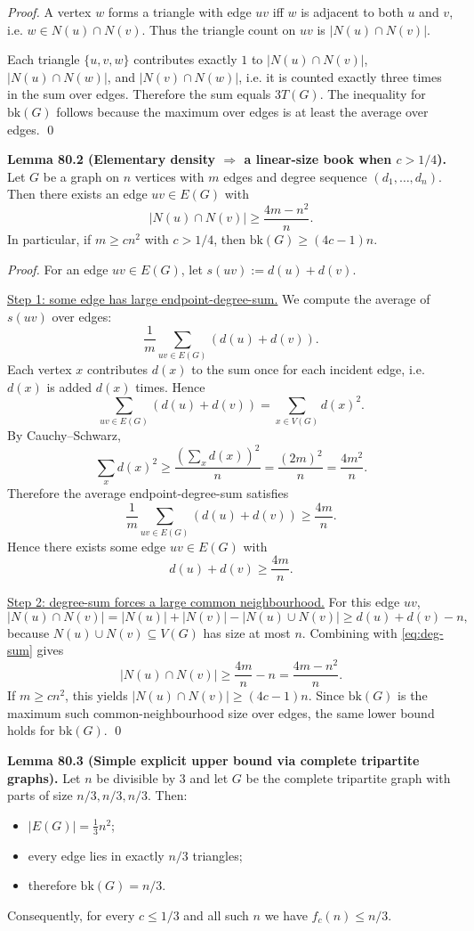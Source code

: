 \emph{Proof.}
A vertex $w$ forms a triangle with edge $uv$ iff $w$ is adjacent to both $u$ and $v$, i.e. $w\in N(u)\cap N(v)$. Thus the triangle count on $uv$ is $|N(u)\cap N(v)|$.

Each triangle $\{u,v,w\}$ contributes exactly $1$ to $|N(u)\cap N(v)|$, $|N(u)\cap N(w)|$, and $|N(v)\cap N(w)|$, i.e. it is counted exactly three times in the sum over edges. Therefore the sum equals $3T(G)$. The inequality for $\mathrm{bk}(G)$ follows because the maximum over edges is at least the average over edges. \qed

\medskip
\noindent\textbf{Lemma 80.2 (Elementary density $\Rightarrow$ a linear-size book when $c>1/4$).}
Let $G$ be a graph on $n$ vertices with $m$ edges and degree sequence $(d_1,\dots,d_n)$. Then there exists an edge $uv\in E(G)$ with
\[
|N(u)\cap N(v)|\ge \frac{4m-n^2}{n}.
\]
In particular, if $m\ge c n^2$ with $c>1/4$, then $\mathrm{bk}(G)\ge (4c-1)n$.

\emph{Proof.}
For an edge $uv\in E(G)$, let $s(uv):=d(u)+d(v)$.

\underline{Step 1: some edge has large endpoint-degree-sum.}
We compute the average of $s(uv)$ over edges:
\[
\frac{1}{m}\sum_{uv\in E(G)} (d(u)+d(v)).
\]
Each vertex $x$ contributes $d(x)$ to the sum once for each incident edge, i.e. $d(x)$ is added $d(x)$ times. Hence
\[
\sum_{uv\in E(G)} (d(u)+d(v)) = \sum_{x\in V(G)} d(x)^2.
\]
By Cauchy--Schwarz,
\[
\sum_{x} d(x)^2 \ge \frac{\left(\sum_x d(x)\right)^2}{n} = \frac{(2m)^2}{n} = \frac{4m^2}{n}.
\]
Therefore the average endpoint-degree-sum satisfies
\[
\frac{1}{m}\sum_{uv\in E(G)} (d(u)+d(v)) \ge \frac{4m}{n}.
\]
Hence there exists some edge $uv\in E(G)$ with
\begin{equation}\label{eq:deg-sum}
 d(u)+d(v)\ge \frac{4m}{n}.
\end{equation}

\underline{Step 2: degree-sum forces a large common neighbourhood.}
For this edge $uv$,
\[
|N(u)\cap N(v)| = |N(u)|+|N(v)|-|N(u)\cup N(v)| \ge d(u)+d(v)-n,
\]
because $N(u)\cup N(v)\subseteq V(G)$ has size at most $n$.
Combining with \eqref{eq:deg-sum} gives
\[
|N(u)\cap N(v)|\ge \frac{4m}{n}-n = \frac{4m-n^2}{n}.
\]
If $m\ge c n^2$, this yields $|N(u)\cap N(v)|\ge (4c-1)n$. Since $\mathrm{bk}(G)$ is the maximum such common-neighbourhood size over edges, the same lower bound holds for $\mathrm{bk}(G)$. \qed

\medskip
\noindent\textbf{Lemma 80.3 (Simple explicit upper bound via complete tripartite graphs).}
Let $n$ be divisible by $3$ and let $G$ be the complete tripartite graph with parts of size $n/3,n/3,n/3$. Then:
\begin{itemize}
\item $|E(G)|=\frac{1}{3}n^2$;
\item every edge lies in exactly $n/3$ triangles;
\item therefore $\mathrm{bk}(G)=n/3$.
\end{itemize}
Consequently, for every $c\le 1/3$ and all such $n$ we have $f_c(n)\le n/3$.

